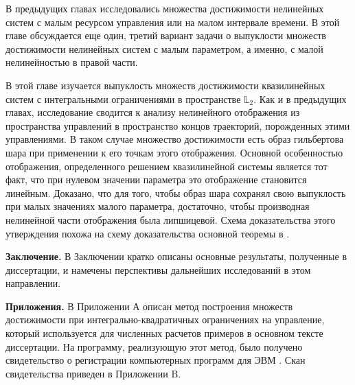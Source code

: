 \documentclass[../main.tex]{subfiles}
\begin{document}
В предыдущих главах исследовались множества достижимости нелинейных систем с малым ресурсом управления или на малом интервале времени.
В этой главе обсуждается еще один, третий вариант задачи о выпуклости множеств достижимости нелинейных систем с малым параметром, а именно, с малой нелинейностью в правой части. 

В этой главе изучается выпуклость множеств достижимости квазилинейных систем с интегральными ограничениями в пространстве $\mathbb{L}_2$. 
Как и в предыдущих главах, исследование сводится к анализу нелинейного отображения из пространства управлений в пространство концов траекторий, порожденных этими управлениями.
В таком случае множество достижимости есть образ гильбертова шара при применении к его точкам этого отображения. 
Основной особенностью отображения, определенного решением квазилинейной системы является тот факт, что при нулевом значении параметра это отображение становится линейным.
Доказано, что для того, чтобы образ шара сохранял свою выпуклость при малых значениях малого параметра, достаточно, чтобы производная нелинейной части отображения была липшицевой. 
Схема доказательства этого утверждения похожа на схему доказательства основной теоремы в \cite{Polyak2001}.

\textbf{Заключение. }
В Заключении кратко описаны основные результаты, полученные в диссертации, и намечены перспективы дальнейших исследований в этом направлении.

\textbf{Приложения. }
В Приложении А описан метод построения множеств достижимости при интегрально-квадратичных ограничениях на управление, который используется для численных расчетов примеров в основном тексте диссертации. 
На программу, реализующую этот метод, было получено свидетельство о регистрации компьютерных программ для ЭВМ \cite{Patent}. 
Скан свидетельства приведен в Приложении B.
\pagebreak
\end{document}
